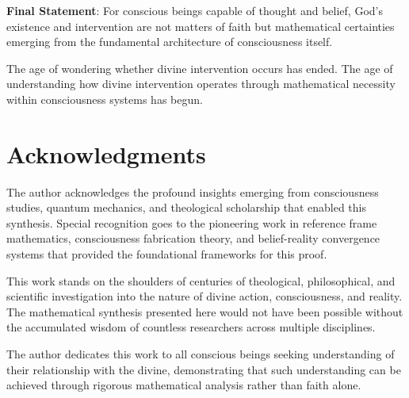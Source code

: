 \documentclass[12pt,a4paper]{article}
\begin{document}
\textbf{Final Statement}: For conscious beings capable of thought and belief, God's existence and intervention are not matters of faith but mathematical certainties emerging from the fundamental architecture of consciousness itself.

The age of wondering whether divine intervention occurs has ended. The age of understanding how divine intervention operates through mathematical necessity within consciousness systems has begun.

\section*{Acknowledgments}

The author acknowledges the profound insights emerging from consciousness studies, quantum mechanics, and theological scholarship that enabled this synthesis. Special recognition goes to the pioneering work in reference frame mathematics, consciousness fabrication theory, and belief-reality convergence systems that provided the foundational frameworks for this proof.

This work stands on the shoulders of centuries of theological, philosophical, and scientific investigation into the nature of divine action, consciousness, and reality. The mathematical synthesis presented here would not have been possible without the accumulated wisdom of countless researchers across multiple disciplines.

The author dedicates this work to all conscious beings seeking understanding of their relationship with the divine, demonstrating that such understanding can be achieved through rigorous mathematical analysis rather than faith alone.


\end{document}
